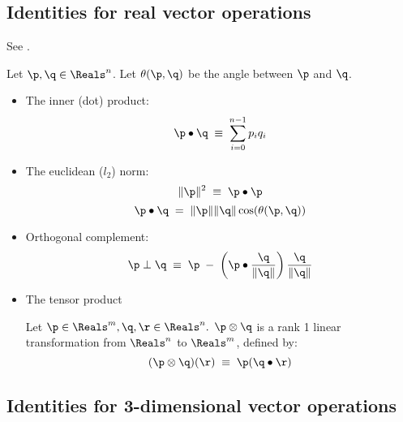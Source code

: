 \label{sec:general}



\subsection{Identities for real vector operations}
\label{sec:RX}

See \cite[p. 85, ex. 4-9]{Spivak:1965:CalculusOnManifolds}.

Let $\p, \q \in \Reals^{n}$.
Let $\theta(\p,\q)$ be the angle between $\p$ and $\q$.

\begin{itemize}
\item The inner (dot) product:
\begin{equation}
\p \bullet \q \; \equiv \; \sum_{i=0}^{n-1} p_i q_i
\end{equation}

\item The euclidean ($l_2$) norm:
\begin{equation}
\| \p \|^2 \; \equiv \; \p \bullet \p
\end{equation}
\begin{equation}
\p \bullet \q \; = \; \| \p \| \| \q \| \cos(\theta(\p,\q))
\end{equation}

\item Orthogonal complement:
\begin{equation}
\p \perp \q \; \equiv \; \p \; - \; \left( \p \bullet \frac{\q}{\|\q\|}\right) \frac{\q}{\|\q\|}
\end{equation}

\item The tensor product

Let $\p \in \Reals^m, \q, \r \in \Reals^n.$
$\p \otimes \q$ is a rank 1 linear transformation
from $\Reals^n$ to $\Reals^m$, defined by:
\begin{equation}
(\p \otimes \q)(\r) \; \equiv \; \p (\q \bullet \r)
\end{equation}

\end{itemize}


\subsection{Identities for 3-dimensional vector operations}
\label{sec:R3X}

